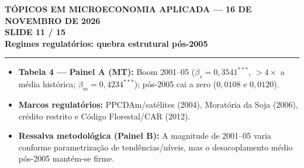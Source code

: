 \documentclass[11pt,a4paper]{article}
\newcommand{\slidenum}{1}
\begin{document}
\newpage

\renewcommand{\slidenum}{11}
\noindent
\begin{minipage}{\textwidth}
\begin{center}
{\color{cinza}\footnotesize\textbf{TÓPICOS EM MICROECONOMIA APLICADA --- 16 DE NOVEMBRO DE 2026}\\[1.2mm]}
{\color{cinza}\bfseries\Large SLIDE 11 / 15\\[1.5mm]}
{\color{verde}\bfseries\LARGE Regimes regulatórios: quebra estrutural pós-2005\\[2.5mm]}
\rule{\textwidth}{1pt}
\end{center}
\end{minipage}
\vspace{1.5mm}

\begin{tcolorbox}[title={\bfseries\small ÂNCORAS EMPÍRICAS E CONCEITUAIS DO SLIDE}]
\begin{itemize}[leftmargin=*,itemsep=1mm,topsep=0.5mm]
    \item \textbf{Tabela 4 — Painel A (MT):} Boom 2001--05 ($\beta_s = 0{,}3541^{***}$, $>4\times$ a média histórica; $\beta_m = 0{,}4234^{***}$); pós-2005 cai a zero ($0{,}0108$ e $0{,}0120$).
    \item \textbf{Marcos regulatórios:} PPCDAm/satélites (2004), Moratória da Soja (2006), crédito restrito e Código Florestal/CAR (2012).
    \item \textbf{Ressalva metodológica (Painel B):} A magnitude de 2001--05 varia conforme parametrização de tendências/níveis, mas o desacoplamento médio pós-2005 mantém-se firme.
\end{itemize}
\end{tcolorbox}
\vspace{2mm}
\end{document}
